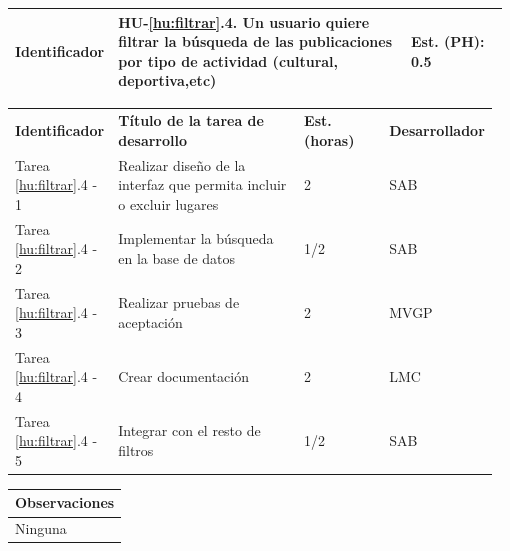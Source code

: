 \documentclass[11pt]{article}
\begin{document}
\begin{longtable}{p{0.18\linewidth}|p{0.6\linewidth}|p{0.2\linewidth}}
  \rowcolor{LightCyan}
  \textbf{Identificador} & \textbf{HU-\ref{hu:filtrar}.4}. Un usuario quiere filtrar la búsqueda de las publicaciones por tipo de actividad (cultural, deportiva,etc) & \textbf{Est. (PH):} 0.5 \\
  \bottomrule
\end{longtable}
\vspace{-0.5cm}
\begin{longtable}{p{0.18\linewidth}|p{0.4\linewidth}|p{0.18\linewidth}|p{0.2\linewidth}}
  \toprule
  \textbf{Identificador} & \textbf{Título de la tarea de desarrollo} & \textbf{Est. (horas)} & \textbf{Desarrollador} \\
  Tarea \ref{hu:filtrar}.4 - 1 & Realizar diseño de la interfaz que permita incluir o excluir lugares & 2 & SAB\\
  Tarea \ref{hu:filtrar}.4 - 2 & Implementar la búsqueda en la base de datos & 1/2 & SAB \\
  Tarea \ref{hu:filtrar}.4 - 3 & Realizar pruebas de aceptación & 2 & MVGP\\
  Tarea \ref{hu:filtrar}.4 - 4 & Crear documentación & 2 & LMC\\
  Tarea \ref{hu:filtrar}.4 - 5 & Integrar con el resto de filtros & 1/2 & SAB\\
  \bottomrule
\end{longtable}
\vspace{-0.5cm}
\begin{longtable}{p{1.028\linewidth}}
  \textbf{Observaciones}\\
  \midrule
  Ninguna\\
  \bottomrule
\end{longtable}
\end{document}
